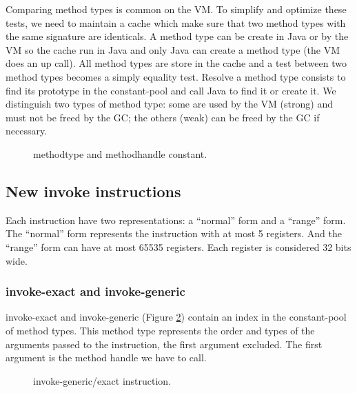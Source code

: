 \documentclass{sig-alternate}
\begin{document}
    Comparing method types is common on the VM.
    To simplify and optimize these tests, we need to maintain a cache which make sure that two method types with the same signature are identicals.
    A method type can be create in Java or by the VM so the cache run in Java and only Java can create a method type (the VM does an up call).
    All method types are store in the cache and a test between two method types becomes a simply equality test.
    Resolve a method type consists to find its prototype in the constant-pool and call Java to find it or create it.
    We distinguish two types of method type: some are used by the VM (strong) and must not be freed by the GC; the others (weak) can be freed by the GC if necessary.

    \begin{figure}[!h]
      \centering \resizebox{.9\linewidth}{!}{}
      \caption{methodtype and methodhandle constant.}\vspace{-1em}
      \label{MTMHldc}
    \end{figure}

  \subsection{New invoke instructions}
    Each instruction have two representations: a ``normal'' form and a ``range'' form.
    The ``normal'' form represents the instruction with at most 5 registers.
    And the ``range'' form can have at most 65535 registers.
    Each register is considered 32 bits wide.

    \subsubsection{invoke-exact and invoke-generic}

      invoke-exact and invoke-generic (Figure \ref{INGEins}) contain an index in the constant-pool of method types.
      This method type represents the order and types of the arguments passed to the instruction, the first argument excluded.
      The first argument is the method handle we have to call.\\

      \begin{figure}[!h]
        \centering \resizebox{.9\linewidth}{!}{}
        \caption{invoke-generic/exact instruction.}\vspace{-1em}
        \label{INGEins}
      \end{figure}
\end{document}
